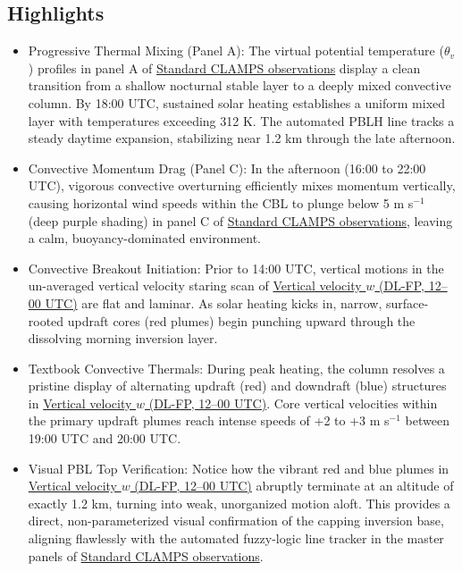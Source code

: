 \documentclass[11pt]{article}
\begin{document}
\subsection*{Highlights}
\begin{itemize}
  \item Progressive Thermal Mixing (Panel A): The virtual potential temperature ($\theta_v$) profiles in panel A of \hyperref[fig:deep_cbl_c2:deep_cbl_c2_instrument_template_4panel]{Standard CLAMPS observations} display a clean transition from a shallow nocturnal stable layer to a deeply mixed convective column. By 18:00 UTC, sustained solar heating establishes a uniform mixed layer with temperatures exceeding 312 K. The automated PBLH line tracks a steady daytime expansion, stabilizing near 1.2 km through the late afternoon.
  \item Convective Momentum Drag (Panel C): In the afternoon (16:00 to 22:00 UTC), vigorous convective overturning efficiently mixes momentum vertically, causing horizontal wind speeds within the CBL to plunge below 5 m s$^{-1}$ (deep purple shading) in panel C of \hyperref[fig:deep_cbl_c2:deep_cbl_c2_instrument_template_4panel]{Standard CLAMPS observations}, leaving a calm, buoyancy-dominated environment.
  \item Convective Breakout Initiation: Prior to 14:00 UTC, vertical motions in the un-averaged vertical velocity staring scan of \hyperref[fig:deep_cbl_c2:deep_cbl_c2_aux_raw_w_timeheight]{Vertical velocity $w$ (DL-FP, 12–00 UTC)} are flat and laminar. As solar heating kicks in, narrow, surface-rooted updraft cores (red plumes) begin punching upward through the dissolving morning inversion layer.
  \item Textbook Convective Thermals: During peak heating, the column resolves a pristine display of alternating updraft (red) and downdraft (blue) structures in \hyperref[fig:deep_cbl_c2:deep_cbl_c2_aux_raw_w_timeheight]{Vertical velocity $w$ (DL-FP, 12–00 UTC)}. Core vertical velocities within the primary updraft plumes reach intense speeds of +2 to +3 m s$^{-1}$ between 19:00 UTC and 20:00 UTC.
  \item Visual PBL Top Verification: Notice how the vibrant red and blue plumes in \hyperref[fig:deep_cbl_c2:deep_cbl_c2_aux_raw_w_timeheight]{Vertical velocity $w$ (DL-FP, 12–00 UTC)} abruptly terminate at an altitude of exactly 1.2 km, turning into weak, unorganized motion aloft. This provides a direct, non-parameterized visual confirmation of the capping inversion base, aligning flawlessly with the automated fuzzy-logic line tracker in the master panels of \hyperref[fig:deep_cbl_c2:deep_cbl_c2_instrument_template_4panel]{Standard CLAMPS observations}.

\end{itemize}
\end{document}
